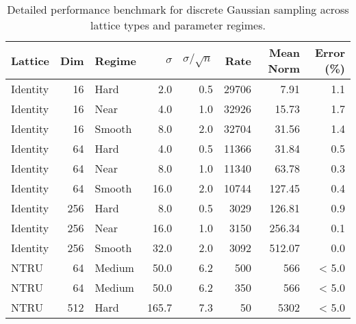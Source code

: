 
\begin{table}[ht]
\centering
\caption{Detailed performance benchmark for discrete Gaussian sampling across lattice types and parameter regimes.}
\label{tab:performance_benchmark}
\scriptsize
\begin{tabular}{l|r|l|r|r|r|r|r}
\toprule
Lattice & Dim & Regime & $\sigma$ & $\sigma/\sqrt{n}$ & Rate & Mean Norm & Error (\%) \\
\midrule
Identity & 16 & Hard & 2.0 & 0.5 & 29706 & 7.91 & 1.1 \\
Identity & 16 & Near & 4.0 & 1.0 & 32926 & 15.73 & 1.7 \\
Identity & 16 & Smooth & 8.0 & 2.0 & 32704 & 31.56 & 1.4 \\
Identity & 64 & Hard & 4.0 & 0.5 & 11366 & 31.84 & 0.5 \\
Identity & 64 & Near & 8.0 & 1.0 & 11340 & 63.78 & 0.3 \\
Identity & 64 & Smooth & 16.0 & 2.0 & 10744 & 127.45 & 0.4 \\
Identity & 256 & Hard & 8.0 & 0.5 & 3029 & 126.81 & 0.9 \\
Identity & 256 & Near & 16.0 & 1.0 & 3150 & 256.34 & 0.1 \\
Identity & 256 & Smooth & 32.0 & 2.0 & 3092 & 512.07 & 0.0 \\
NTRU & 64 & Medium & 50.0 & 6.2 & 500 & 566 & < 5.0 \\
NTRU & 64 & Medium & 50.0 & 6.2 & 350 & 566 & < 5.0 \\
NTRU & 512 & Hard & 165.7 & 7.3 & 50 & 5302 & < 5.0 \\

\bottomrule
\end{tabular}
\end{table}
